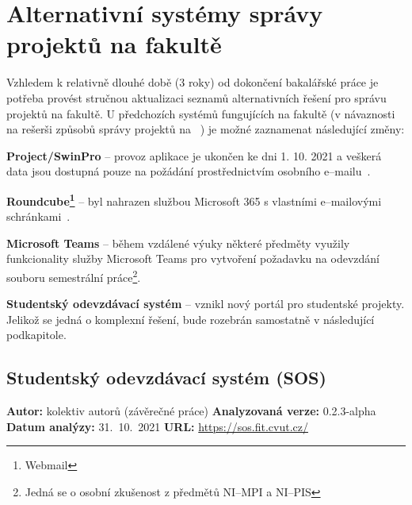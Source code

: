 \section{Alternativní systémy správy projektů na fakultě}

Vzhledem k relativně dlouhé době (3 roky) od dokončení bakalářské práce je potřeba provést stručnou aktualizaci seznamů alternativních řešení pro správu projektů na fakultě.
U předchozích systémů fungujících na fakultě (v návaznosti na rešerši způsobů správy projektů na  ~\cite{bachelorthesis}) je možné zaznamenat následující změny:

\begin{ul}
   \item
   \textbf{Project/SwinPro} – provoz aplikace je ukončen ke dni 1. 10. 2021 a veškerá data jsou dostupná pouze na požádání prostřednictvím osobního e–mailu~\cite{swinpro}.
   \item
   \textbf{Roundcube\footnote{Webmail}} – byl nahrazen službou Microsoft 365 s vlastními e–mailovými schránkami~\cite{emailsfitcvut}.
   \item
   \textbf{Microsoft Teams} – během vzdálené výuky některé předměty využily funkcionality služby Microsoft Teams pro vytvoření požadavku na odevzdání souboru semestrální práce\footnote{Jedná se o osobní zkušenost z předmětů NI–MPI a NI–PIS}.
   \item
   \textbf{Studentský odevzdávací systém} – vznikl nový portál pro studentské projekty.
   Jelikož se jedná o komplexní řešení, bude rozebrán samostatně v následující podkapitole.
\end{ul}



\subsection{Studentský odevzdávací systém (SOS)}

\textbf{Autor:} kolektiv autorů (závěrečné práce)\newline
\textbf{Analyzovaná verze:} 0.2.3-alpha\newline
\textbf{Datum analýzy:} 31.~10.~2021\newline
\textbf{URL:} \url{https://sos.fit.cvut.cz/}

